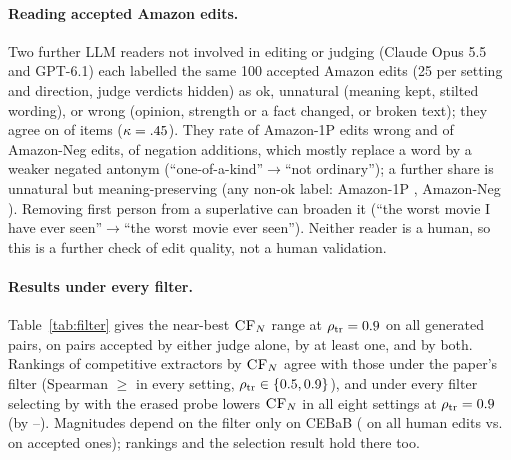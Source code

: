 \paragraph{Reading accepted Amazon edits.} Two further LLM readers not involved in editing or judging (Claude Opus 5.5 and GPT-6.1) each labelled the same 100 accepted Amazon edits (25 per setting and direction, judge verdicts hidden) as ok, unnatural (meaning kept, stilted wording), or wrong (opinion, strength or a fact changed, or broken text); they agree on \rdAgree{} of items ($\kappa=.45$). They rate \rdWrongFp{} of Amazon-1P edits wrong and \rdWrongNeg{} of Amazon-Neg edits, \rdWrongNegAdd{} of negation additions, which mostly replace a word by a weaker negated antonym (``one-of-a-kind''$\to$``not ordinary''); a further share is unnatural but meaning-preserving (any non-ok label: Amazon-1P \rdNotOkFp, Amazon-Neg \rdNotOkNeg). Removing first person from a superlative can broaden it (``the worst movie I have ever seen''$\to$``the worst movie ever seen''). Neither reader is a human, so this is a further check of edit quality, not a human validation.

\paragraph{Results under every filter.} Table~\ref{tab:filter} gives the near-best $\cfn$ range at $\rhot=0.9$ on all generated pairs, on pairs accepted by either judge alone, by at least one, and by both. Rankings of competitive extractors by $\cfn$ agree with those under the paper's filter (Spearman $\geq$\frSpearMin{} in every setting, $\rho_{\text{tr}}\in\{0.5,0.9\}$), and under every filter selecting by \conf{} with the erased probe lowers $\cfn$ in all eight settings at $\rhot=0.9$ (by \frSelFullMin--\frSelFullMax). Magnitudes depend on the filter only on CEBaB (\frCebabAll{} on all human edits vs.\ \frCebabBoth{} on accepted ones); rankings and the selection result hold there too.

\begin{table}[h]
\centering\small\setlength{\tabcolsep}{3pt}
\resizebox{\columnwidth}{!}{}
\caption{Share of edits with a planted error that each judge accepts (50 per row). ``None (retest)'': unmodified accepted edits, re-judged.}
\label{tab:planted}
\end{table}

\begin{table}[t]
\centering\small\setlength{\tabcolsep}{4pt}
\resizebox{\textwidth}{!}{}
\caption{Near-best $\cfn$ at $\rhot=0.9$ (Qwen2.5-7B / Gemma-2-9B) under different edit filters; the number before the colon is the number of nuisance pairs.}
\label{tab:filter}
\end{table}
